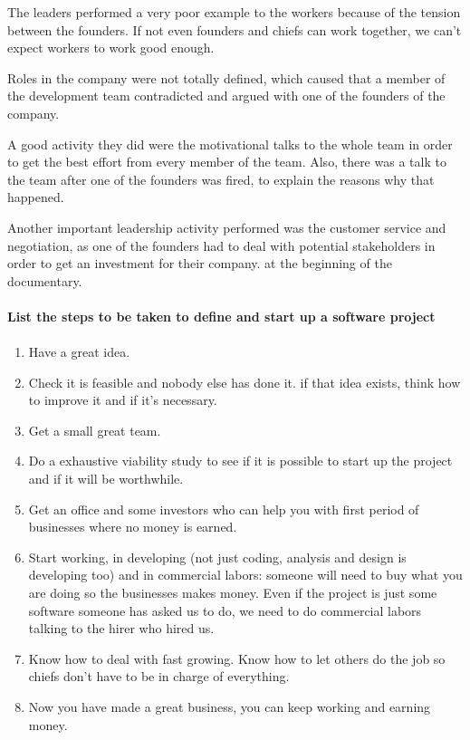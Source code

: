 \documentclass{article}
\begin{document}
The leaders performed a very poor example to the workers because of the tension between the founders. If not even founders and chiefs can work together, we can't expect workers to work good enough.

Roles in the company were not totally defined, which caused that a member of the development team contradicted and argued with one of the founders of the company.

A good activity they did were the motivational talks to the whole team in order to get the best effort from every member of the team. Also, there was a talk to the team after one of the founders was fired, to explain the reasons why that happened. 

Another important leadership activity performed was the customer service and negotiation, as one of the founders had to deal with potential stakeholders in order to get an investment for their company. at the beginning of the documentary.



\paragraph{List the steps to be taken to define and start up a software project}
\paragraph{}

\begin{enumerate}
	\item Have a great idea.
	\item Check it is feasible and nobody else has done it.
	\subitem if that idea exists, think how to improve it and if it's necessary.
	\item Get a small great team.
	\item Do a exhaustive viability study to see if it is possible to start up the project and if it will be worthwhile.
	\item Get an office and some investors who can help you with first period of businesses where no money is earned.
	\item Start working, in developing (not just coding, analysis and design is developing too) and in commercial labors: someone will need to buy what you are doing so the businesses makes money. Even if the project is just some software someone has asked us to do, we need to do commercial labors talking to the hirer who hired us.
	\item Know how to deal with fast growing. Know how to let others do the job so chiefs don't have to be in charge of everything.
	\item Now you have made a great business, you can keep working and earning money.
\end{enumerate}
\end{document}
